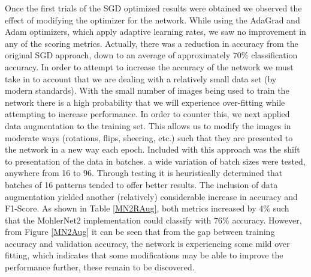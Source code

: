\documentclass[12pt]{article}
\begin{document}
Once the first trials of the SGD optimized results were obtained we observed the effect of modifying the optimizer for the network. While using the AdaGrad and Adam optimizers, which apply adaptive learning rates, we saw no improvement in any of the scoring metrics. Actually, there was a reduction in accuracy from the original SGD approach, down to an average of approximately $70\%$ classification accuracy. In order to attempt to increase the accuracy of the network we must take in to account that we are dealing with a relatively small data set (by modern standards). With the small number of images being used to train the network there is a high probability that we will experience over-fitting while attempting to increase performance. In order to counter this, we next applied data augmentation to the training set. This allows us to modify the images in moderate ways (rotations, flips, sheering, etc.) such that they are presented to the network in a new way each epoch. Included with this approach was the shift to presentation of the data in batches. a wide variation of batch sizes were tested, anywhere from 16 to 96. Through testing it is heuristically determined that batches of 16 patterns tended to offer better results. The inclusion of data augmentation yielded another (relatively) considerable increase in accuracy and F1-Score. As shown in Table \ref{MN2RAug}, both metrics increased by $4\%$ such that the MohlerNet2 implementation could classify with $76\%$ accuracy. However, from Figure \ref{MN2Aug} it can be seen that from the gap between training accuracy and validation accuracy, the network is experiencing some mild over fitting, which indicates that some modifications may be able to improve the performance further, these remain to be discovered.
\end{document}
